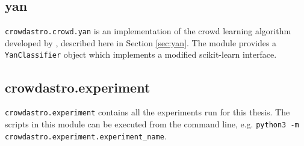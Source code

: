         \subsection{yan}
            \label{sec:crowdastro-yan}

            \texttt{crowdastro.crowd.yan} is an implementation of the crowd
            learning algorithm developed by \citet{yan10}, described here in
            Section \ref{sec:yan}. The module provides a \texttt{YanClassifier}
            object which implements a modified scikit-learn interface.

    \subsection{crowdastro.experiment}
    \label{sec:crowdastro-experiment}

        \texttt{crowdastro.experiment} contains all the experiments run for this
        thesis. The scripts in this module can be executed from the command
        line, e.g. \texttt{python3 -m crowdastro.experiment.experiment\_name}.